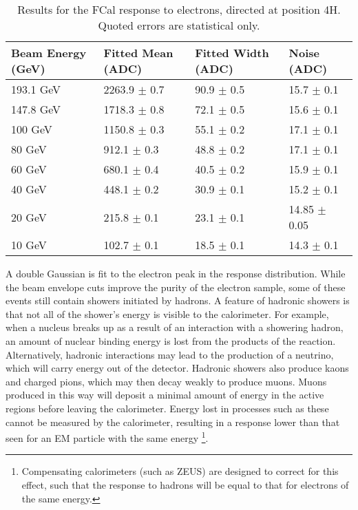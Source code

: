 \begin{table}[p]
\begin{center}
\begin{tabular}{|l|l|l|l|}
\hline
Beam Energy (GeV) & Fitted Mean (ADC)& Fitted Width (ADC)& Noise (ADC) \\
\hline
193.1 GeV  &  2263.9 $\pm$     0.7 &    90.9 $\pm$     0.5 &    15.7 $\pm$     0.1 \\
147.8 GeV  &  1718.3 $\pm$     0.8 &    72.1 $\pm$     0.5 &    15.6 $\pm$     0.1 \\
100 GeV  &  1150.8 $\pm$     0.3 &    55.1 $\pm$     0.2 &    17.1 $\pm$     0.1 \\
80 GeV  &   912.1 $\pm$     0.3 &    48.8 $\pm$     0.2 &    17.1 $\pm$     0.1 \\
60 GeV  &   680.1 $\pm$     0.4 &    40.5 $\pm$     0.2 &    15.9 $\pm$     0.1 \\
40 GeV  &   448.1 $\pm$     0.2 &    30.9 $\pm$     0.1 &    15.2 $\pm$     0.1 \\
20 GeV  &   215.8 $\pm$     0.1 &    23.1 $\pm$     0.1 &    14.85 $\pm$     0.05 \\
10 GeV  &   102.7 $\pm$     0.1 &    18.5 $\pm$     0.1 &    14.3 $\pm$     0.1 \\
\hline
\end{tabular}
\end{center}
\caption{Results for the FCal response to electrons, directed at position 4H. Quoted errors are statistical only.}
\label{TBres_table_elec_4H}
\end{table}


A double Gaussian is fit to the electron peak in the response distribution. While the beam envelope cuts improve the purity of the electron sample, some of these events still contain showers initiated by hadrons. A feature of hadronic showers is that not all of the shower's energy is visible to the calorimeter. For example, when a nucleus breaks up as a result of an interaction with a showering hadron, an amount of nuclear binding energy is lost from the products of the reaction. Alternatively, hadronic interactions may lead to the production of a neutrino, which will carry energy out of the detector. Hadronic showers also produce kaons and charged pions, which may then decay weakly to produce muons. Muons produced in this way will deposit a minimal amount of energy in the active regions before leaving the calorimeter. Energy lost in processes such as these cannot be measured by the calorimeter, resulting in a response lower than that seen for an EM particle with the same energy \footnote{Compensating calorimeters (such as ZEUS\cite{zeus}) are designed to correct for this effect, such that the response to hadrons will be equal to that for electrons of the same energy.}.


